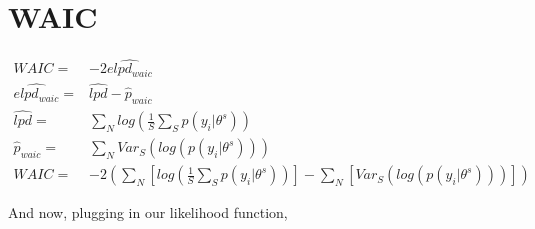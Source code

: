 \documentclass[12pt]{article}
\begin{document}
\newpage


\section{WAIC}
\begin{align}
WAIC =& -2 \widehat{elpd_{waic}}\\
\widehat{elpd_{waic}} =& \widehat{lpd} - \hat{p}_{waic}\\
\widehat{lpd} =& \sum\limits_N log\left(\frac{1}{S}\sum\limits_S p(y_i | \theta^s)	\right)\\
\hat{p}_{waic} =& \sum\limits_N Var_S\left( log \left( p(y_i | \theta^s) \right)	\right)\\
WAIC =& -2 \left( \sum\limits_N \left[ log\left(\frac{1}{S}\sum\limits_S p(y_i | \theta^s)	\right) \right]-
	\sum\limits_N \left[ Var_S\left( log \left( p(y_i | \theta^s) \right)	\right) \right]	\right)
\end{align}


And now, plugging in our likelihood function,
\end{document}
